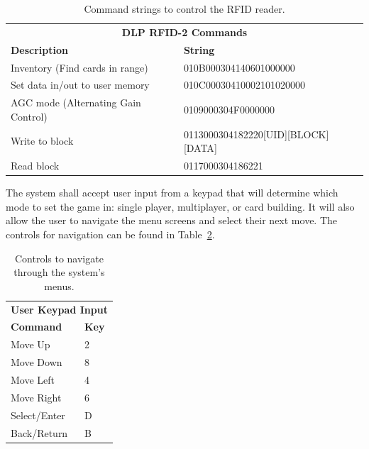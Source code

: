 \documentclass[12pt]{article} %
\begin{document}
\begin{table}[h]
	\begin{tabular}{ll}
		\multicolumn{2}{c}{\textbf{DLP RFID-2 Commands}}                                     \\
		\textbf{Description}                & \textbf{String}                                \\
		Inventory (Find cards in range)     & 010B000304140601000000                         \\
		Set data in/out to user memory      & 010C00030410002101020000                       \\
		AGC mode (Alternating Gain Control) & 0109000304F0000000                             \\
		Write to block                      & 0113000304182220{[}UID{]}{[}BLOCK{]}{[}DATA{]} \\
		Read block                          & 0117000304186221                              
	\end{tabular}
	\caption{Command strings to control the RFID reader.}
	\label{Tab:DLP RFID-2 input commands}
\end{table}

The system shall accept user input from a keypad that will determine which mode to set the game in: single player, multiplayer, or card building. It will also allow the user to navigate the menu screens and select their next move. The controls for navigation can be found in Table~\ref{Tab:controlsTable}.

\begin{table}[h]
	\begin{tabular}{ll}
		\multicolumn{2}{c}{\textbf{User Keypad Input}} \\
		\textbf{Command}         & \textbf{Key}        \\
		Move Up                  & 2                   \\
		Move Down                & 8                   \\
		Move Left                & 4                   \\
		Move Right               & 6                   \\
		Select/Enter             & D                   \\
		Back/Return              & B                  
	\end{tabular}
	\caption{Controls to navigate through the system's menus.}
	\label{Tab:controlsTable}
\end{table}
\end{document}
